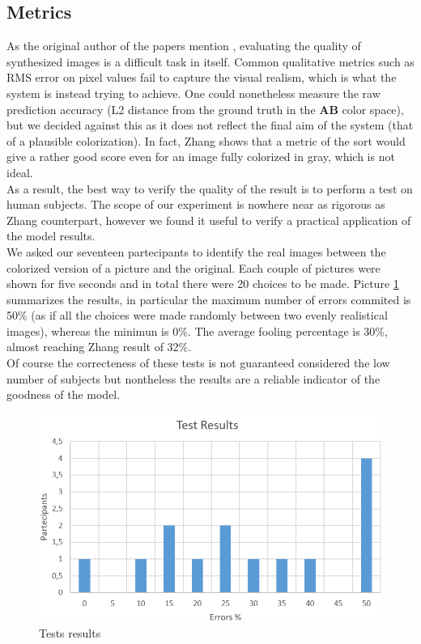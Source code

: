 \documentclass[twoside,twocolumn]{article}
\begin{document}
\subsection{Metrics}

As the original author of the papers mention \cite{Zhang:2016}, evaluating the quality of synthesized images is a difficult task in itself. Common qualitative metrics such as RMS error on pixel values fail to capture the visual realism, which is what the system is instead trying to achieve. 
One could nonetheless measure the raw prediction accuracy (L2 distance from the ground truth in the \textbf{AB} color space), but we decided against this as it does not reflect the final aim of the system (that of a plausible colorization). In fact, Zhang \cite{Zhang:2016} shows that a metric of the sort would give a rather good score even for an image fully colorized in gray, which is not ideal.\\
As a result, the best way to verify the quality of the result is to perform a test on human subjects. The scope of our experiment is nowhere near as rigorous as Zhang counterpart, however we found it useful to verify a practical application of the model results.\\
We asked our seventeen partecipants to identify the real images between the colorized version of a picture and the original. Each couple of pictures were shown for five seconds and in total there were 20 choices to be made.
Picture \ref{fig:testres} summarizes the results, in particular the maximum number of errors commited is 50\% (as if all the choices were made randomly between two evenly realistical images), whereas the minimun is 0\%. The average fooling percentage is 30\%, almost reaching Zhang \cite{Zhang:2016} result of 32\%.\\
Of course the correcteness of these tests is not guaranteed considered the low number of subjects but nontheless the results are a reliable indicator of the goodness of the model.

\begin{figure}
	\includegraphics[width=\linewidth]{img/graficotest.png}
	\caption{Tests results}
	\label{fig:testres}
\end{figure}
\end{document}
